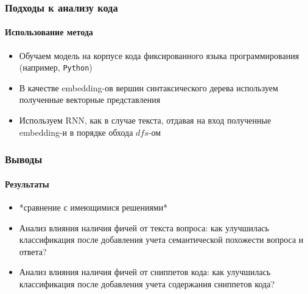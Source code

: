 \documentclass[10pt]{beamer}
\begin{document}

\begin{frame}
\frametitle{Подходы к анализу кода}
\framesubtitle{Использование метода}

\begin{itemize}
	\item Обучаем модель на корпусе кода фиксированного языка программирования (например, \texttt{Python})
	\item В качестве embedding-ов вершин синтаксического дерева используем полученные векторные представления 
	\item Используем RNN, как в случае текста, отдавая на вход полученные embedding-и в порядке обхода $dfs$-ом
\end{itemize}

\end{frame}


\begin{frame}
\frametitle{Выводы}
\framesubtitle{Результаты}

\begin{itemize}
	\item *сравнение с имеющимися решениями*
	\item Анализ влияния наличия фичей от текста вопроса: как улучшилась классификация после добавления учета семантической похожести вопроса и ответа?
	\item Анализ влияния наличия фичей от сниппетов кода: как улучшилась классификация после добавления учета содержания сниппетов кода?
\end{itemize}

\end{frame}
\end{document}
